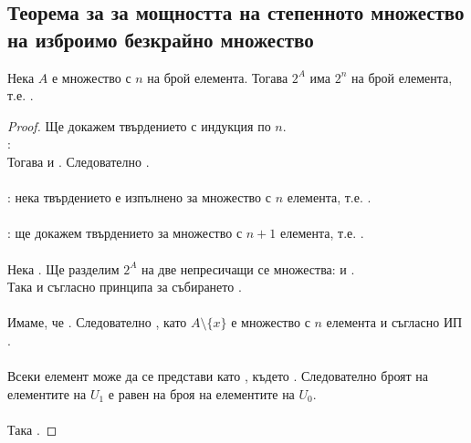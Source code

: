 \subsection{Теорема за за мощността на степенното множество на изброимо безкрайно множество}
\begin{theorem}
    Нека \(A\) е множество с \(n\) на брой елемента. Тогава \(2^A\) има \(2^n\) на брой елемента, т.е. 
    .
\end{theorem}
\begin{proof}
    Ще докажем твърдението с индукция по \(n\). \\
    :  \\
    Тогава  и .
    Следователно . \\ \\
    : нека твърдението е изпълнено за множество с \(n\) елемента, т.е. 
    . \\ \\
    : ще докажем твърдението за множество с \(n + 1\) елемента, т.е. 
    . \\ \\
    Нека . Ще разделим \(2^A\) на две непресичащи се множества:
     и . \\
    Така  и съгласно принципа за събирането . \\ \\
    Имаме, че . Следователно , 
    като \(A \setminus \{x\}\) е множество с \(n\) елемента и съгласно ИП . \\ \\
    Всеки елемент  може да се представи като , където .
    Следователно броят на елементите на \(U_1\) е равен на броя на елементите на \(U_0\). \\ \\
    Така .
\end{proof}

